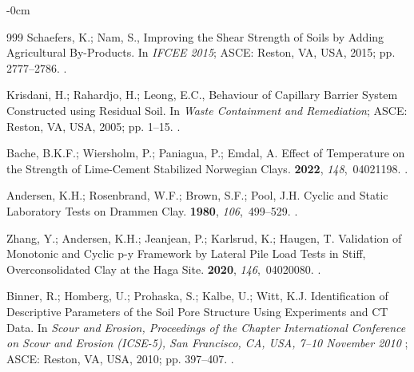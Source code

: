 \documentclass[algorithms,article,accept,pdftex,moreauthors]{Definitions/mdpi}
\begin{document}
\begin{adjustwidth}{-\extralength}{0cm}
\begin{thebibliography}{999}
Schaefers, K.; Nam, S., Improving the Shear Strength of Soils by Adding
  Agricultural By-Products.
\newblock In {\em IFCEE 2015}; ASCE: Reston, VA, USA, 2015; pp. 2777--2786. %
.

Krisdani, H.; Rahardjo, H.; Leong, E.C., Behaviour of Capillary Barrier System
  Constructed using Residual Soil.
\newblock In {\em Waste Containment and Remediation}; ASCE: Reston, VA, USA, 2005; pp. 1--15. %
.

Bache, B.K.F.; Wiersholm, P.; Paniagua, P.; Emdal, A.
\newblock Effect of Temperature on the Strength of Lime-Cement Stabilized
  Norwegian Clays.
 {\bf
  2022}, {\em 148},~04021198.
.

Andersen, K.H.; Rosenbrand, W.F.; Brown, S.F.; Pool, J.H.
\newblock Cyclic and Static Laboratory Tests on Drammen Clay.
 {\bf 1980},
  {\em 106},~499--529.
.

Zhang, Y.; Andersen, K.H.; Jeanjean, P.; Karlsrud, K.; Haugen, T.
\newblock Validation of Monotonic and Cyclic p-y Framework by Lateral Pile Load
  Tests in Stiff, Overconsolidated Clay at the Haga Site.
 {\bf
  2020}, {\em 146},~04020080.
.

Binner, R.; Homberg, U.; Prohaska, S.; Kalbe, U.; Witt, K.J. Identification of
  Descriptive Parameters of the Soil Pore Structure Using Experiments and CT
  Data.
\newblock In {\em Scour and Erosion, Proceedings of the Chapter International
  Conference on Scour and Erosion (ICSE-5), San Francisco, CA, USA, 7--10 November 2010 %
}; ASCE: Reston, VA, USA, 2010; pp. 397--407. %
.


\end{thebibliography}
\end{adjustwidth}
\end{document}
